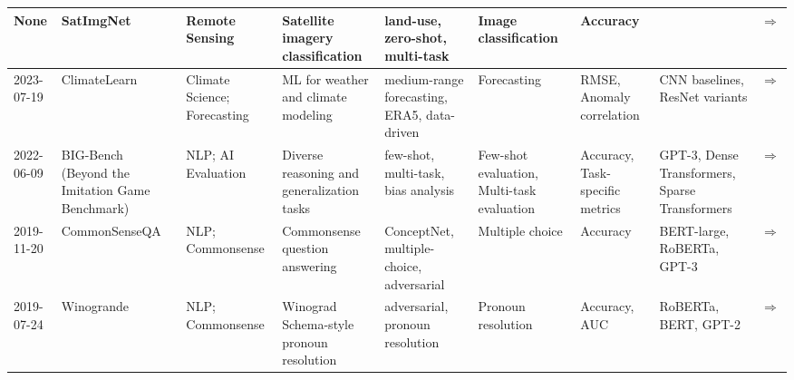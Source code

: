 \documentclass{article}
\begin{document}
\begin{landscape}
{\begin{longtable}{|p{1.5cm}|p{2.5cm}|p{2cm}|p{2cm}|p{2.5cm}|p{3cm}|p{2cm}|p{2cm}|p{1cm}|}
None & SatImgNet & Remote Sensing & Satellite imagery classification & land-use, zero-shot, multi-task & Image classification & Accuracy &  & \cite{roberts2023satinmultitaskmetadatasetclassifying} \href{https://arxiv.org/abs/2304.11619}{$\Rightarrow$ } \\ \hline
2023-07-19 & ClimateLearn & Climate Science; Forecasting & ML for weather and climate modeling & medium-range forecasting, ERA5, data-driven & Forecasting & RMSE, Anomaly correlation & CNN baselines, ResNet variants & \cite{nguyen2023climatelearnbenchmarkingmachinelearning} \href{https://arxiv.org/abs/2307.01909}{$\Rightarrow$ } \\ \hline
2022-06-09 & BIG-Bench (Beyond the Imitation Game Benchmark) & NLP; AI Evaluation & Diverse reasoning and generalization tasks & few-shot, multi-task, bias analysis & Few-shot evaluation, Multi-task evaluation & Accuracy, Task-specific metrics & GPT-3, Dense Transformers, Sparse Transformers & \cite{srivastava2023imitationgamequantifyingextrapolating} \href{https://arxiv.org/abs/2206.04615}{$\Rightarrow$ } \\ \hline
2019-11-20 & CommonSenseQA & NLP; Commonsense & Commonsense question answering & ConceptNet, multiple-choice, adversarial & Multiple choice & Accuracy & BERT-large, RoBERTa, GPT-3 & \cite{talmor2019commonsenseqaquestionansweringchallenge} \href{https://arxiv.org/abs/1811.00937}{$\Rightarrow$ } \\ \hline
2019-07-24 & Winogrande & NLP; Commonsense & Winograd Schema-style pronoun resolution & adversarial, pronoun resolution & Pronoun resolution & Accuracy, AUC & RoBERTa, BERT, GPT-2 & \cite{sakaguchi2019winograndeadversarialwinogradschema} \href{https://arxiv.org/abs/1907.10641}{$\Rightarrow$ } \\ \hline
\end{longtable}
}
\end{landscape}
\printbibliography
\end{document}
